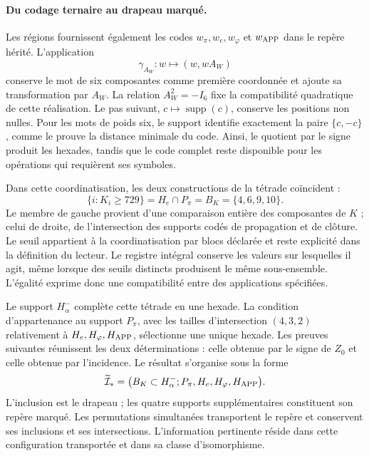 \paragraph{Du codage ternaire au drapeau marqué.}
\label{inc-ampl-bandera}
Les régions fournissent également les codes $w_\pi,w_e,w_\varphi$ et
$w_{\rm APP}$ dans le repère hérité. L'application
\[
 \gamma_{A_W}:w\longmapsto(w,wA_W)
\]
conserve le mot de six composantes comme première coordonnée et ajoute
sa transformation par $A_W$. La relation $A_W^2=-I_6$ fixe la
compatibilité quadratique de cette réalisation. Le pas suivant,
$c\mapsto\operatorname{supp}(c)$, conserve les positions non nulles.
Pour les mots de poids six, le support identifie exactement la paire
$\{c,-c\}$, comme le prouve la distance minimale du code. Ainsi,
le quotient par le signe produit les hexades, tandis que le code complet
reste disponible pour les opérations qui requièrent ses symboles.

Dans cette coordinatisation, les deux constructions de la tétrade coïncident :
\begin{equation}
 \{i:K_i\geq729\}
 =H_e\cap P_\pi=B_K=\{4,6,9,10\}.
 \label{inc-ampl-cuaterna}
\end{equation}
Le membre de gauche provient d'une comparaison entière des composantes
de $K$ ; celui de droite, de l'intersection des supports codés de
propagation et de clôture. Le seuil appartient à la coordinatisation par blocs
déclarée et reste explicité dans la définition du lecteur. Le
registre intégral conserve les valeurs sur lesquelles il agit, même lorsque
des seuils distincts produisent le même sous-ensemble. L'égalité exprime
donc une compatibilité entre des applications spécifiées.

Le support $H^-_\alpha$ complète cette tétrade en une hexade. La
condition d'appartenance au support $P_\pi$, avec les tailles
d'intersection $(4,3,2)$ relativement à $H_e,H_\varphi,H_{\rm APP}$,
sélectionne une unique hexade. Les preuves suivantes réunissent les deux
déterminations : celle obtenue par le signe de $Z_0$ et celle obtenue
par l'incidence. Le résultat s'organise sous la forme
\begin{equation}
 \widetilde{\mathcal I}_*
 =\bigl(B_K\subset H^-_\alpha;
         P_\pi,H_e,H_\varphi,H_{\rm APP}\bigr).
 \label{inc-ampl-marco}
\end{equation}
L'inclusion est le drapeau ; les quatre supports supplémentaires constituent
son repère marqué. Les permutations simultanées transportent le repère et
conservent ses inclusions et ses intersections. L'information pertinente réside
dans cette configuration transportée et dans sa classe d'isomorphisme.

